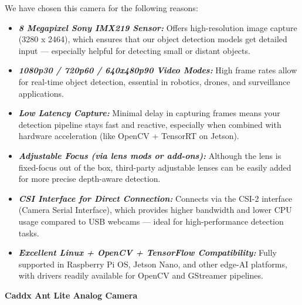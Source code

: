 \documentclass[12pt]{report}
\begin{document}
        We have chosen this camera for the following reasons:
        \begin{itemize}
          \item \textbf{\textit{8 Megapixel Sony IMX219 Sensor:}} Offers high-resolution image capture (3280 x 2464), which ensures that our object detection models get detailed input — especially helpful for detecting small or distant objects. 
          \item \textbf{\textit{1080p30 / 720p60 / 640x480p90 Video Modes:}} High frame rates allow for real-time object detection, essential in robotics, drones, and surveillance applications.
          \item \textbf{\textit{Low Latency Capture:}} Minimal delay in capturing frames means your detection pipeline stays fast and reactive, especially when combined with hardware acceleration (like OpenCV + TensorRT on Jetson).
          \item \textbf{\textit{Adjustable Focus (via lens mods or add-ons):}} Although the lens is fixed-focus out of the box, third-party adjustable lenses can be easily added for more precise depth-aware detection.
          \item \textbf{\textit{CSI Interface for Direct Connection:}} Connects via the CSI-2 interface (Camera Serial Interface), which provides higher bandwidth and lower CPU usage compared to USB webcams — ideal for high-performance detection tasks.
          \item \textbf{\textit{Excellent Linux + OpenCV + TensorFlow Compatibility:}} Fully supported in Raspberry Pi OS, Jetson Nano, and other edge-AI platforms, with drivers readily available for OpenCV and GStreamer pipelines.
        \end{itemize}
        \vspace{1cm} 
        \noindent \textbf{\large Caddx Ant Lite Analog Camera} \\
\end{document}
